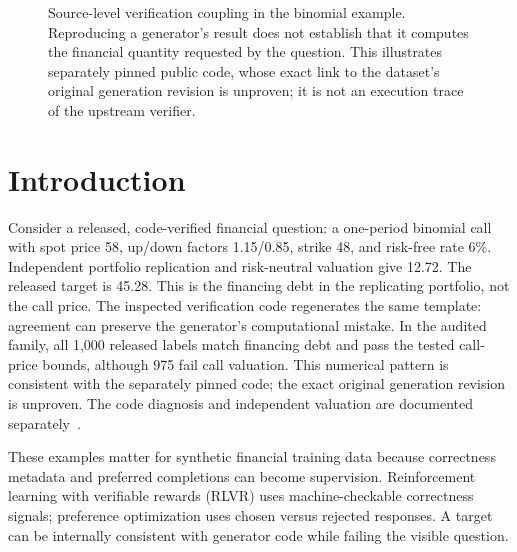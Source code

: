 \begin{figure}[!ht]
\centering
{}
\caption{Source-level verification coupling in the binomial example. Reproducing a generator's result does not
establish that it computes the financial quantity requested by the question. This illustrates separately pinned public code, whose exact link to the dataset's original generation revision is unproven; it is not an execution trace of the upstream verifier.}
\end{figure}

\section{Introduction}
Consider a released, code-verified financial question: a one-period binomial call with spot price 58, up/down factors 1.15/0.85, strike 48, and risk-free rate 6\%. Independent portfolio replication and
risk-neutral valuation give 12.72. The released target is 45.28. This is the financing debt in the replicating portfolio, not the call price. The inspected verification code regenerates the same template:
agreement can preserve the generator's computational mistake. In the audited family, all 1,000 released labels match financing debt and pass the tested call-price bounds, although 975 fail call valuation. This numerical pattern is consistent with the separately pinned code; the exact original generation revision is unproven. The code diagnosis and independent valuation are documented separately~\cite{cosimosource,crr}.

These examples matter for synthetic financial training data because correctness metadata and preferred completions can become supervision. Reinforcement learning with verifiable rewards (RLVR) uses
machine-checkable correctness signals; preference optimization uses chosen versus rejected responses. A target can be internally consistent with generator code while failing the visible question.

